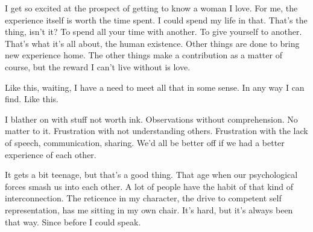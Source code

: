 

I get so excited at the prospect of getting to know a woman I love.
For me, the experience itself is worth the time spent.  I could spend
my life in that.  That's the thing, isn't it?  To spend all your time
with another.  To give yourself to another.  That's what it's all
about, the human existence.  Other things are done to bring new
experience home.  The other things make a contribution as a matter of
course, but the reward I can't live without is love.

Like this, waiting, I have a need to meet all that in some sense.  In
any way I can find.  Like this.

I blather on with stuff not worth ink.  Observations without
comprehension.  No matter to it.  Frustration with not understanding
others.  Frustration with the lack of speech, communication, sharing.
We'd all be better off if we had a better experience of each other.

It gets a bit teenage, but that's a good thing.  That age when our
psychological forces smash us into each other.  A lot of people have
the habit of that kind of interconnection.  The reticence in my
character, the drive to competent self representation, has me sitting
in my own chair.  It's hard, but it's always been that way.  Since
before I could speak.

\bye
